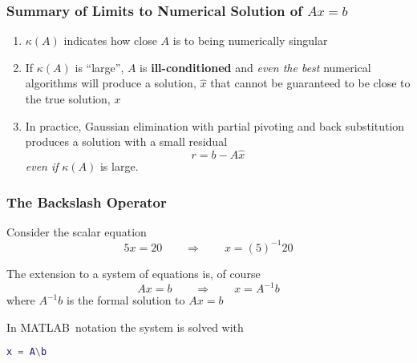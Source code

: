 \documentclass[10pt]{beamer}
\begin{document}
\begin{frame}
\frametitle{Summary of Limits to Numerical Solution of $Ax=b$}

\begin{enumerate}
    \item   $\kappa(A)$ indicates how close $A$ is to being numerically singular
    \item   If $\kappa(A)$ is ``large'', $A$ is \textbf{ill-conditioned} and
            \emph{even the best} numerical algorithms will produce a solution,
            $\hat{x}$ that cannot be guaranteed to be close to the true
            solution, $x$
    \item   In practice, Gaussian elimination with partial pivoting and
            back substitution produces a solution with a small residual
\begin{equation*}
                r = b - A\hat{x}
\end{equation*}
            \emph{even if} $\kappa(A)$ is large.
\end{enumerate}

\end{frame}
\begin{frame}[fragile]
\frametitle{The Backslash Operator}

Consider the scalar equation
\begin{equation*}
    5x = 20
    \qquad
    \Longrightarrow
    \qquad
    x = (5)^{-1}20
\end{equation*}

The extension to a system of equations is, of course
\begin{equation*}
    Ax = b
    \qquad
    \Longrightarrow
    \qquad
    x = A^{-1}b
\end{equation*}
where $A^{-1}b$ is the formal solution to $Ax=b$

In MATLAB\ notation the system is solved with
\begin{lstlisting}[language=matlab]
    x = A\b
\end{lstlisting}


\end{frame}
\end{document}
